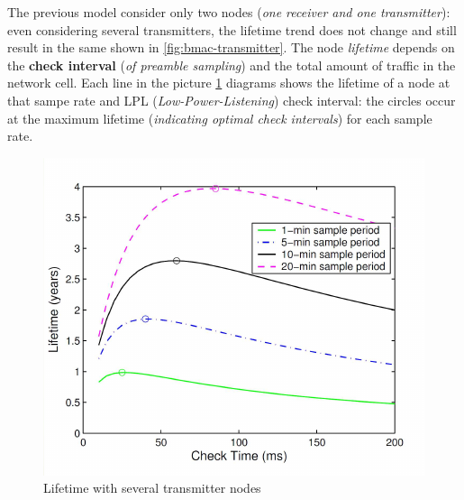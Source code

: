 \documentclass[10pt,a4paper]{report}
\theoremstyle{definition}
\begin{document}
The previous model consider only two nodes (\textit{one receiver and one transmitter}): even considering several transmitters, the lifetime trend does not change and still result in the same shown in \ref{fig:bmac-transmitter}.
The node \textit{lifetime} depends on the \textbf{check interval} (\textit{of preamble sampling}) and the total amount of traffic in the network cell.
Each line in the picture \ref{fig:bmac-multitrans} diagrams shows the lifetime of a node at that sampe rate and LPL (\textit{Low-Power-Listening}) check interval: the circles occur at the maximum lifetime (\textit{indicating optimal check intervals}) for each sample rate.
\begin{figure}[h]
	\centering\includegraphics[scale=0.50]{images/Pasted image 20230409085338.png}
	\caption{Lifetime with several transmitter nodes}
	\label{fig:bmac-multitrans}
\end{figure}
\end{document}
